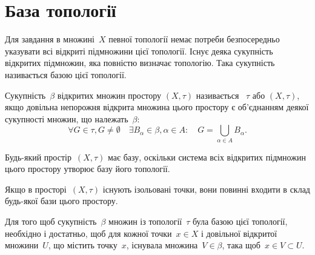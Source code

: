 \section{База топології}

Для завдання в множині~$X$ певної топології немає
потреби безпосередньо указувати всі відкриті підмножини
цієї топології. Існує деяка сукупність відкритих підмножин,
яка повністю визначає топологію. Така сукупність
називається базою цієї топології.

\begin{definition}
Сукупність~$\beta$ відкритих множин простору
$(X, \tau)$ називається ~$\tau$ або 
$(X, \tau)$, якщо довільна непорожня відкрита множина цього
простору є об'єднанням деякої сукупності множин, що
належать~$\beta$: \[ \forall G \in \tau, G \ne \emptyset \quad \exists B_\alpha \in \beta, \alpha \in A: \quad G = \bigcup_{\alpha \in A} B_\alpha. \]
\end{definition}

\begin{remark}
Будь-який простір~$(X, \tau)$ має базу,
оскільки система всіх відкритих підмножин цього простору
утворює базу його топології.
\end{remark}

\begin{remark}
Якщо в просторі~$(X, \tau)$ існують
ізольовані точки, вони повинні входити в склад будь-якої
бази цього простору.
\end{remark}

\begin{theorem}
Для того щоб сукупність~$\beta$ множин із
топології~$\tau$ була базою цієї топології, необхідно і
достатньо, щоб для кожної точки~$x \in X$ і довільної
відкритої множини~$U$, що містить точку~$x$, існувала
множина~$V \in \beta$, така щоб~$x \in V \subset U$.
\end{theorem}

